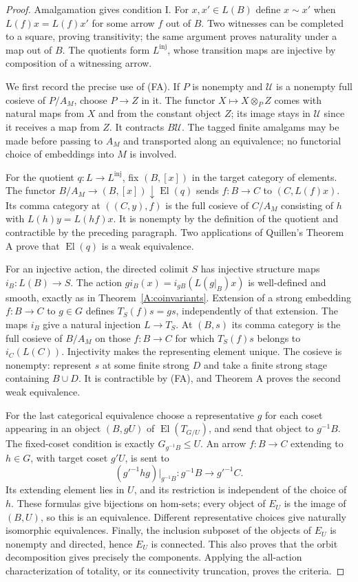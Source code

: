 \begin{proof}
Amalgamation gives condition I. For $x,x'\in L(B)$ define $x\sim x'$
when $L(f)x=L(f)x'$ for some arrow $f$ out of $B$. Two witnesses can
be completed to a square, proving transitivity; the same argument
proves naturality under a map out of $B$. The quotients form
$L^{\mathrm{inj}}$, whose transition maps are injective by composition
of a witnessing arrow.

We first record the precise use of (FA). If $P$ is nonempty and
$\mathcal U$ is a nonempty full cosieve of $P/A_M$, choose $P\to Z$
in it. The functor $X\mapsto X\otimes_PZ$ comes with natural maps
from $X$ and from the constant object $Z$; its image stays in
$\mathcal U$ since it receives a map from $Z$. It contracts
$B\mathcal U$. The tagged finite amalgams may be made before passing
to $A_M$ and transported along an equivalence; no functorial choice
of embeddings into $M$ is involved.

For the quotient $q:L\to L^{\mathrm{inj}}$, fix $(B,[x])$ in the
target category of elements. The functor $B/A_M\to
(B,[x])\downarrow\operatorname{El}(q)$ sends $f:B\to C$ to
$(C,L(f)x)$. Its comma category at $((C,y),f)$ is the full cosieve
of $C/A_M$ consisting of $h$ with $L(h)y=L(hf)x$. It is nonempty
by the definition of the quotient and contractible by the preceding
paragraph. Two applications of Quillen's Theorem A prove that
$\operatorname{El}(q)$ is a weak equivalence.

For an injective action, the directed colimit $S$ has injective
structure maps $i_B:L(B)\to S$. The action
$g i_B(x)=i_{gB}(L(g|_B)x)$ is well-defined and smooth, exactly as
in Theorem~\ref{A:coinvariants}. Extension of a strong embedding
$f:B\to C$ to $g\in G$ defines $T_S(f)s=gs$, independently of that
extension. The maps $i_B$ give a natural injection $L\to T_S$.
At $(B,s)$ its comma category is the full cosieve of $B/A_M$ on
those $f:B\to C$ for which $T_S(f)s$ belongs to $i_C(L(C))$.
Injectivity makes the representing element unique. The cosieve is
nonempty: represent $s$ at some finite strong $D$ and take a finite
strong stage containing $B\cup D$. It is contractible by (FA),
and Theorem A proves the second weak equivalence.

For the last categorical equivalence choose a representative $g$
for each coset appearing in an object $(B,gU)$ of
$\operatorname{El}(T_{G/U})$, and send that object to $g^{-1}B$.
The fixed-coset condition is exactly $G_{g^{-1}B}\leq U$.
An arrow $f:B\to C$ extending to $h\in G$, with target coset $g'U$,
is sent to
\[
 (g'^{-1}hg)|_{g^{-1}B}:g^{-1}B\longrightarrow g'^{-1}C.
\]
Its extending element lies in $U$, and its restriction is independent
of the choice of $h$. These formulas give bijections on hom-sets;
every object of $E_U$ is the image of $(B,U)$, so this is an
equivalence. Different representative choices give naturally
isomorphic equivalences. Finally, the inclusion subposet of the
objects of $E_U$ is nonempty and directed, hence $E_U$ is connected.
This also proves that the orbit decomposition gives precisely the
components. Applying the all-action characterization of totality,
or its connectivity truncation, proves the criteria.
\end{proof}

